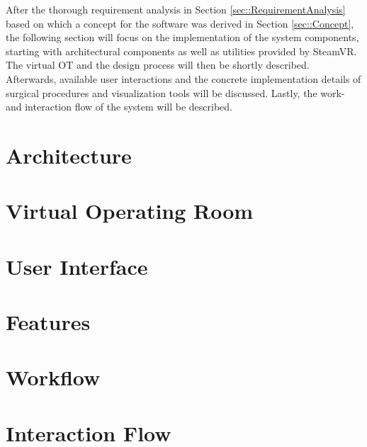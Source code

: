 After the thorough requirement analysis in Section \ref{sec::RequirementAnalysis} based on which a concept for the software was derived in Section \ref{sec::Concept}, 
the following section will focus on the implementation of the system components, starting with architectural components as well as utilities provided by SteamVR.
The virtual OT and the design process will then be shortly described.
Afterwards, available user interactions and the concrete implementation details of surgical procedures and visualization tools will be discussed.
Lastly, the work- and interaction flow of the system will be described.

\section{\label{sec::Architecture}Architecture}

\section{\label{sec::VirtualOperatingRoom}Virtual Operating Room}

\section{\label{sec::UserInterface}User Interface}

\section{\label{sec::Features}Features}

\section{\label{sec::Workflow}Workflow}

\section{\label{sec::InteractionFlow}Interaction Flow}
